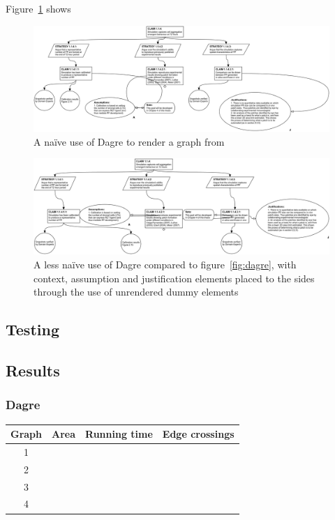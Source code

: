 Figure~\ref{fig:dagre1} shows

\begin{figure}
  \centering
  \includegraphics[width=\textwidth]{graphics/results/dagre.png}
  \caption{A na\"ive use of Dagre to render a graph from \cite{aldenthesis}}
  \label{fig:dagre1}
\end{figure}



\begin{figure}
  \centering
  \includegraphics[width=\textwidth]{graphics/results/dagre-enhanced.png}
  \caption{A less na\"ive use of Dagre compared to figure~\ref{fig:dagre}, with context, assumption and justification elements placed to the sides through the use of unrendered dummy elements}
  \label{fig:dagre2}
\end{figure}



\begin{landscape}

\section{Testing}



\subsection{Results}

\subsubsection{Dagre}

\begin{tabular}{ | c | c | c | c | }
    \hline
    Graph & Area & Running time & Edge crossings \\
    \hline
    1     & & & \\
    \hline
    2     & & & \\
    \hline
    3     & & & \\
    \hline
    4     & & & \\
    \hline
\end{tabular}



\end{landscape}
